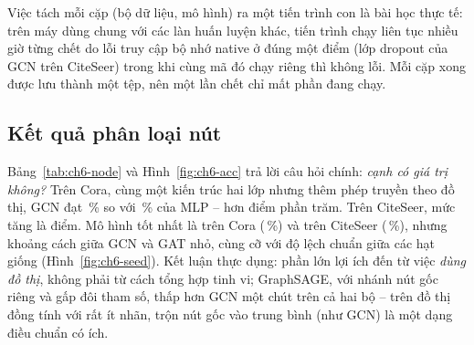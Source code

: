 
Việc tách mỗi cặp (bộ dữ liệu, mô hình) ra một tiến trình con là bài học thực tế: trên máy dùng chung với các làn huấn
luyện khác, tiến trình chạy liên tục nhiều giờ từng chết do lỗi truy cập bộ nhớ native ở đúng một điểm (lớp dropout của
GCN trên CiteSeer) trong khi cùng mã đó chạy riêng thì không lỗi. Mỗi cặp xong được lưu thành một tệp, nên một lần chết
chỉ mất phần đang chạy.

\subsection{Kết quả phân loại nút}
\label{sec:gnn-exp-node}



Bảng~\ref{tab:ch6-node} và Hình~\ref{fig:ch6-acc} trả lời câu hỏi chính: \emph{cạnh có giá trị không?} Trên Cora, cùng
một kiến trúc hai lớp nhưng thêm phép truyền theo đồ thị, GCN đạt \,\% so với
\,\% của MLP -- hơn  điểm phần trăm. Trên
CiteSeer, mức tăng là  điểm. Mô hình tốt nhất là  trên
Cora (\,\%) và  trên CiteSeer
(\,\%), nhưng khoảng cách giữa GCN và GAT nhỏ, cùng cỡ với độ lệch chuẩn giữa các hạt
giống (Hình~\ref{fig:ch6-seed}). Kết luận thực dụng: phần lớn lợi ích đến từ việc \emph{dùng đồ thị}, không phải từ cách
tổng hợp tinh vi; GraphSAGE, với nhánh nút gốc riêng và gấp đôi tham số, thấp hơn GCN một chút trên cả hai bộ -- trên đồ
thị đồng tính với rất ít nhãn, trộn nút gốc vào trung bình (như GCN) là một dạng điều chuẩn có ích.

